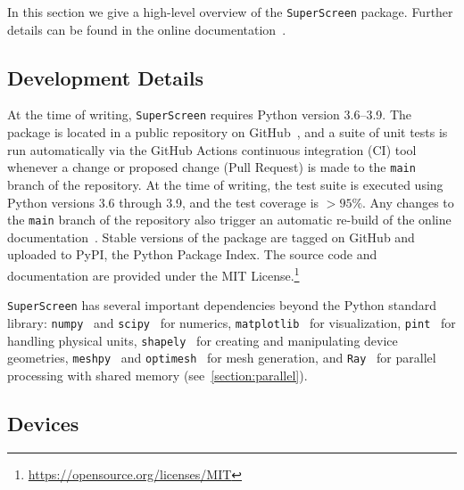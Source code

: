 \documentclass[final,3p,times,twocolumn]{elsarticle}
\newcommand{\inline}[1]{\texttt{#1}\xspace}
\newcommand{\SuperScreen}{\inline{SuperScreen}}
\begin{document}
In this section we give a high-level overview of the \SuperScreen package. Further details can be found in the online documentation~\cite{superscreen-rtd}.

\subsection{Development Details}
\label{section:overview:development}

At the time of writing, \SuperScreen requires Python version 3.6--3.9. The package is located in a public repository on GitHub~\cite{superscreen, BishopVanHorn2021-bd}, and a suite of unit tests is run automatically via the GitHub Actions continuous integration (CI) tool whenever a change or proposed change (Pull Request) is made to the \inline{main} branch of the repository. At the time of writing, the test suite is executed using Python versions 3.6 through 3.9, and the test coverage is $>95\%$. Any changes to the \inline{main} branch of the repository also trigger an automatic re-build of the online documentation~\cite{superscreen-rtd}. Stable versions of the package are tagged on GitHub and uploaded to PyPI, the Python Package Index. The source code and documentation are provided under the MIT License.\footnote{\href{https://opensource.org/licenses/MIT}{https://opensource.org/licenses/MIT}}

\SuperScreen has several important dependencies beyond the Python standard library: \inline{numpy}~\cite{Harris2020-xv} and \inline{scipy}~\cite{Virtanen2020-zz} for numerics, \inline{matplotlib}~\cite{Hunter2007-il} for visualization, \inline{pint}~\cite{Grecco} for handling physical units, \inline{shapely}~\cite{shapely} for creating and manipulating device geometries, \inline{meshpy}~\cite{Klockner, Shewchuk, Shewchuk1996-va} and \inline{optimesh}~\cite{Schlomer2021-ua} for mesh generation, and \inline{Ray}~\cite{Moritz2018-mt,ray-docs} for parallel processing with shared memory (see~\ref{section:parallel}).

\subsection{Devices}
\label{section:overview:device}
\end{document}
